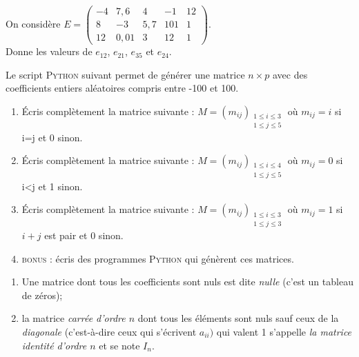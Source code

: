 \documentclass[a4paper,12pt]{book}
\begin{document}
\begin{exercice}[]
On considère 	$E =	\begin{pmatrix}
						    -4      & 7,6 & 4 & -1 & 12 \\ 
						    8 & -3  & 5,7 & 101 & 1 \\
						    12 & 0,01 & 3 & 12 & 1
						\end{pmatrix}$.\\
						
Donne les valeurs de $e_{12}$, $e_{21}$, $e_{35}$ et $e_{24}$.
\end{exercice}

Le script \textsc{Python} suivant permet de générer une matrice $n\times p$ avec des coefficients entiers aléatoires compris entre -100 et 100.



\begin{exercice}[]
\begin{enumerate}[\bfseries 1.]
	\item \'Ecris complètement la matrice suivante : $M=(m_{ij})_{\substack{1\leqslant i\leqslant 3\\1\leqslant j\leqslant 5}}$ où $m_{ij}=i$ si i=j et 0 sinon.
	\item 	\'Ecris complètement la matrice suivante : $M=(m_{ij})_{\substack{1\leqslant i\leqslant 4\\1\leqslant j\leqslant 5}}$ où $m_{ij}=0$ si i<j et 1 sinon.
	\item 	\'Ecris complètement la matrice suivante : $M=(m_{ij})_{\substack{1\leqslant i\leqslant 3\\1\leqslant j\leqslant 3}}$ où $m_{ij}=1$ si $i+j$ est pair et 0 sinon.
	\item \textsc{bonus} : écris des programmes \textsc{Python} qui génèrent ces matrices.
\end{enumerate}
\end{exercice}

\begin{definition}
\begin{enumerate}[--]
	\item 	Une matrice dont tous les coefficients sont nuls est dite \textit{nulle} (c'est \og un tableau de zéros\fg{});
	\item 	la matrice \textit{carrée d'ordre $n$} dont tous les éléments sont nuls sauf ceux de la \textit{diagonale} (c'est-à-dire ceux qui s'écrivent $a_{ii})$ qui valent 1 s'appelle \textit{la matrice identité d'ordre $n$} et se note $I_n$.
\end{enumerate}
\end{definition}
\end{document}
